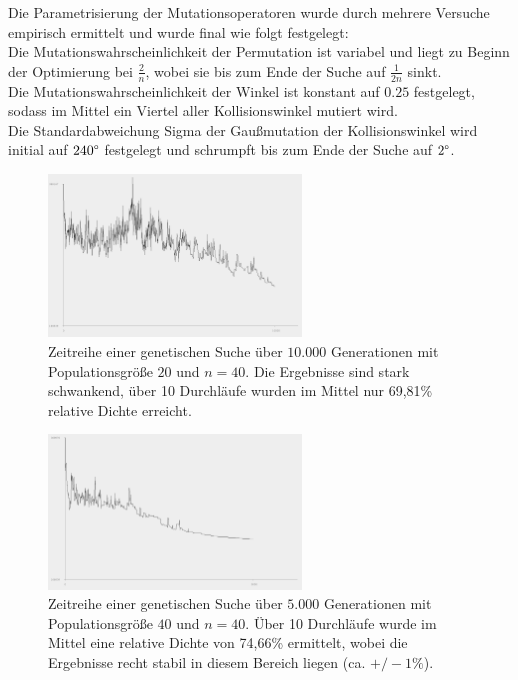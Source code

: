 \documentclass[twoside,bibtotoc]{report}
\begin{document}
\nsecend%



Die Parametrisierung der Mutationsoperatoren wurde durch mehrere Versuche empirisch ermittelt und wurde final wie folgt festgelegt:\\

Die Mutationswahrscheinlichkeit der Permutation ist variabel und liegt zu Beginn der Optimierung bei $\frac{2}{n}$, wobei sie bis zum Ende der Suche auf $\frac{1}{2n}$ sinkt.\\

Die Mutationswahrscheinlichkeit der Winkel ist konstant auf $0.25$ festgelegt, sodass im Mittel ein Viertel aller Kollisionswinkel mutiert wird.\\

Die Standardabweichung Sigma der Gaußmutation der Kollisionswinkel wird initial auf $240\degree$ festgelegt und schrumpft bis zum Ende der Suche auf $2\degree$.

\begin{figure}[H]
 \centering
 \includegraphics [width=0.6\textwidth]{Bilder/Genetic_20.png}
 \caption{
 	Zeitreihe einer genetischen Suche über $10.000$ Generationen mit Populationsgröße $20$ und $n = 40$.
 	Die Ergebnisse sind stark schwankend, über 10 Durchläufe wurden im Mittel nur 69,81\% relative Dichte erreicht.
 	}
 \label{fig:genetic_20}
\end{figure}

\begin{figure}[H]
 \centering
 \includegraphics [width=0.6\textwidth]{Bilder/Genetic_40.png}
 \caption{
 	Zeitreihe einer genetischen Suche über $5.000$ Generationen mit Populationsgröße $40$ und $n = 40$.
 	Über 10 Durchläufe wurde im Mittel eine relative Dichte von 74,66\% ermittelt,
 	wobei die Ergebnisse recht stabil in diesem Bereich liegen (ca. $+/- 1\%$).
 	}
 \label{fig:genetic_40}
\end{figure}
\end{document}
